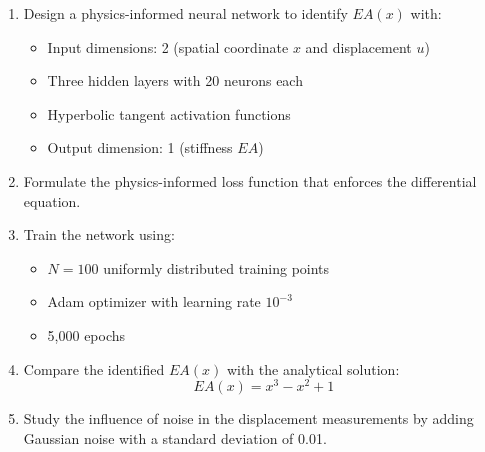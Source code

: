 \documentclass[11pt]{article}
\begin{document}
	\begin{enumerate}
		\item[\textbf{a)}] Design a physics-informed neural network to identify $EA(x)$ with:
		\begin{itemize}
			\item Input dimensions: 2 (spatial coordinate $x$ and displacement $u$)
			\item Three hidden layers with 20 neurons each
			\item Hyperbolic tangent activation functions
			\item Output dimension: 1 (stiffness $EA$)
		\end{itemize}
		
		\item[\textbf{b)}] Formulate the physics-informed loss function that enforces the differential equation.
		
		\item[\textbf{c)}] Train the network using:
		\begin{itemize}
			\item $N = 100$ uniformly distributed training points
			\item Adam optimizer with learning rate $10^{-3}$
			\item 5,000 epochs
		\end{itemize}
		
		\item[\textbf{d)}] Compare the identified $EA(x)$ with the analytical solution:
		\begin{equation*}
			EA(x) = x^3 - x^2 + 1
		\end{equation*}
		
		\item[\textbf{e)}] Study the influence of noise in the displacement measurements by adding Gaussian noise with a standard deviation of 0.01.
	\end{enumerate}
	
\end{document}
